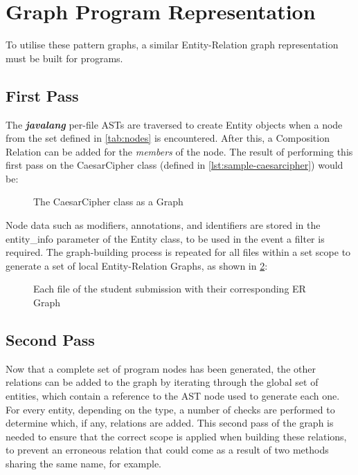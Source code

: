 \section{Graph Program Representation}

To utilise these pattern graphs, a similar Entity-Relation graph representation must be built for programs.

\subsection{First Pass}
The \textbf{\emph{javalang}} per-file ASTs are traversed to create Entity objects when a node from the set defined in \cref{tab:nodes} is encountered. After this, a Composition Relation can be added for the \emph{members} of the node. The result of performing this first pass on the CaesarCipher class (defined in \cref{lst:sample-caesarcipher}) would be:

\begin{figure}[H]
    \centering
    
    \caption{The CaesarCipher class as a Graph}
    \label{fig:CaesarCipherGraph}
\end{figure}

Node data such as modifiers, annotations, and identifiers are stored in the entity\_info parameter of the Entity class, to be used in the event a filter is required. The graph-building process is repeated for all files within a set scope to generate a set of local Entity-Relation Graphs, as shown in \cref{fig:ProgramGraph}:

\begin{figure}[H]
    \centering
    
    \caption{Each file of the student submission with their corresponding ER Graph}
    \label{fig:ProgramGraph}
\end{figure}

\subsection{Second Pass}

Now that a complete set of program nodes has been generated, the other relations can be added to the graph by iterating through the global set of entities, which contain a reference to the AST node used to generate each one. For every entity, depending on the type, a number of checks are performed to determine which, if any, relations are added. This second pass of the graph is needed to ensure that the correct scope is applied when building these relations, to prevent an erroneous relation that could come as a result of two methods sharing the same name, for example.

